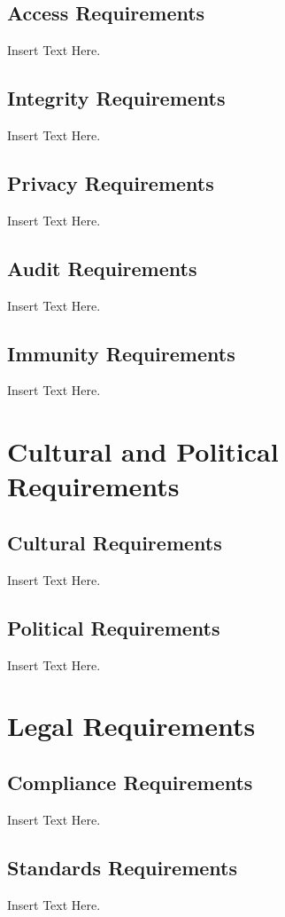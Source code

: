 \documentclass [12pt]{article}
\begin{document}
\subsection{Access Requirements }
		Insert Text Here.

\subsection{Integrity Requirements }
		Insert Text Here.

\subsection{Privacy Requirements }
		Insert Text Here.

\subsection{Audit  Requirements }
		Insert Text Here. 

\subsection{Immunity Requirements  }
		Insert Text Here.

\section{Cultural and Political Requirements } 
\subsection{Cultural Requirements }
		Insert Text Here.

\subsection{Political Requirements }
		Insert Text Here.


\section{Legal Requirements}
\subsection{Compliance Requirements }
		Insert Text Here.
\subsection{Standards Requirements }
		Insert Text Here.
\end{document}
